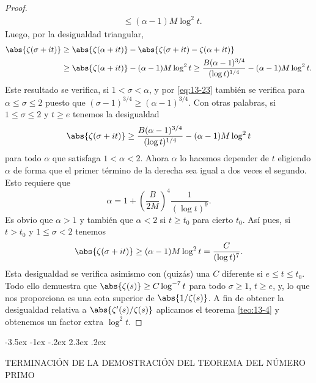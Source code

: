 \documentclass[12pt,a4paper]{book}
\makeatletter
\renewcommand\section{\@startsection{section}{1}{\z@}%
  {-3.5ex \@plus -1ex \@minus -.2ex}%
  {2.3ex \@plus .2ex}%
  {\normalfont\Large\bfseries\raggedright}}
\makeatother
\begin{document}
\begin{proof}
\begin{align*}
            &\leq(\alpha-1)M\log^{2}t.
        \end{align*}
        Luego, por la desigualdad triangular,
        \begin{align*}
            \abs{\zeta(\sigma+it)}&\geq\abs{\zeta(\alpha+it)}-\abs{\zeta(\sigma+it)-\zeta(\alpha+it)}\\
            &\geq\abs{\zeta(\alpha+it)}-(\alpha-1)M\log^{2}t\geq\frac{B(\alpha-1)^{3/4}}{(\log t)^{1/4}}-(\alpha-1)M\log^{2}t.
        \end{align*}
        Este resultado se verifica, si $1<\sigma<\alpha$, y por \eqref{eq:13-23} también se
        verifica para $\alpha\leq\sigma\leq2$ puesto que $(\sigma-1)^{3/4}\geq(\alpha-1)^{3/4}$.
        Con otras palabras, si $1\leq\sigma\leq2$ y $t\geq e$ tenemos la desigualdad
        \begin{equation*}
            \abs{\zeta(\sigma+it)}\geq\frac{B(\alpha-1)^{3/4}}{(\log t)^{1/4}}-(\alpha-1)M\log^{2}t
        \end{equation*}
        para todo $\alpha$ que satisfaga $1<\alpha<2$. Ahora $\alpha$ lo hacemos depender de $t$
        eligiendo $\alpha$ de forma que el primer término de la derecha sea igual a dos veces el
        segundo. Esto requiere que
        \begin{equation*}
            \alpha=1+\left(\frac{B}{2M}\right)^{4}\frac{1}{(\log t)^{9}}.
        \end{equation*}
        Es obvio que $\alpha>1$ y también que $\alpha<2$ si $t\geq t_{0}$ para cierto $t_{0}$. Así
        pues, si $t>t_{0}$ y $1\leq\sigma<2$ tenemos
        \begin{equation*}
            \abs{\zeta(\sigma+it)}\geq(\alpha-1)M\log^{2}t=\frac{C}{(\log t)^{7}}.
        \end{equation*}
        Esta desigualdad se verifica asimismo con (quizás) una $C$ diferente si $e\leq t\leq t_{0}$.
        Todo ello demuestra que $\abs{\zeta(s)}\geq C\log^{-7}t$ para todo $\sigma\geq1$,
        $t\geq e$, y, lo que nos proporciona es una cota superior de $\abs{1/\zeta(s)}$. A fin de
        obtener la desigualdad relativa a $\abs{\zeta'(s)/\zeta(s)}$ aplicamos el teorema
        \ref{teo:13-4} y obtenemos un factor extra $\log^{2}t$.
    \end{proof}

    \section{TERMINACIÓN DE LA DEMOSTRACIÓN DEL TEOREMA DEL NÚMERO PRIMO}
\end{document}
